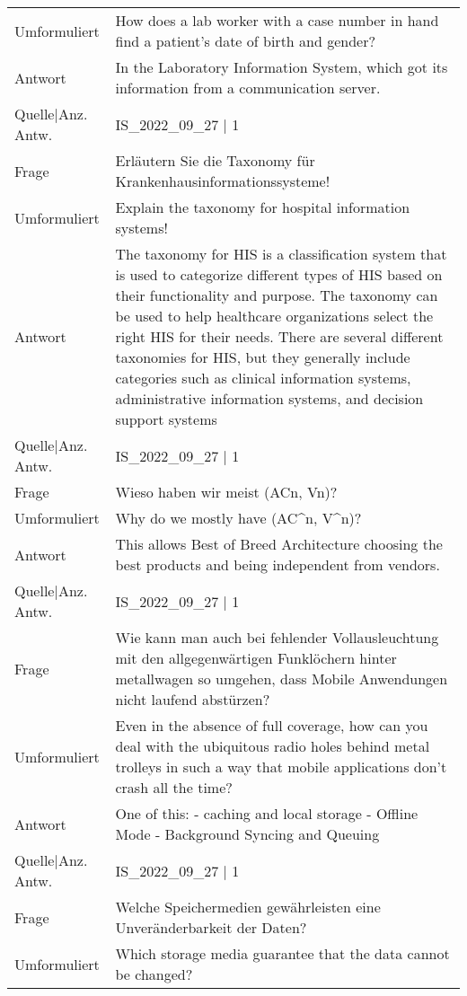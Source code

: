 {\begin{landscape}
\begin{longtable}{p{3cm}p{}}
    Umformuliert & How does a lab worker with a case number in hand find a patient's date of birth and gender? \\
    Antwort & In the Laboratory Information System, which got its information from a communication server.\\
    Quelle|Anz. Antw. & IS\_2022\_09\_27 | 1 \\
    \midrule
    Frage & Erläutern Sie die Taxonomy für Krankenhausinformationssysteme! \\
    Umformuliert & Explain the taxonomy for hospital information systems! \\
    Antwort & The taxonomy for HIS is a classification system that is used to categorize different types of HIS based on their functionality and purpose.
    The taxonomy can be used to help healthcare organizations select the right HIS for their needs.
    There are several different taxonomies for HIS, but they generally include categories such as clinical information systems, administrative information systems, and decision support systems \\
    Quelle|Anz. Antw. & IS\_2022\_09\_27 | 1 \\
    \midrule
    Frage & Wieso haben wir meist (ACn, Vn)? \\
    Umformuliert & Why do we mostly have (AC\textasciicircum{}n, V\textasciicircum{}n)? \\
    Antwort & This allows Best of Breed Architecture choosing the best products and being independent from vendors.\\
    Quelle|Anz. Antw. & IS\_2022\_09\_27 | 1 \\
    \midrule
    Frage & Wie kann man auch bei fehlender Vollausleuchtung mit den allgegenwärtigen Funklöchern hinter metallwagen so umgehen, dass Mobile Anwendungen nicht laufend abstürzen? \\
    Umformuliert & Even in the absence of full coverage, how can you deal with the ubiquitous radio holes behind metal trolleys in such a way that mobile applications don't crash all the time? \\
    Antwort & One of this:
    - caching and local storage
    - Offline Mode
    - Background Syncing and Queuing \\
    Quelle|Anz. Antw. & IS\_2022\_09\_27 | 1 \\
    \midrule
    Frage & Welche Speichermedien gewährleisten eine Unveränderbarkeit der Daten? \\
    Umformuliert & Which storage media guarantee that the data cannot be changed? \\

\end{longtable}
\end{landscape}}
